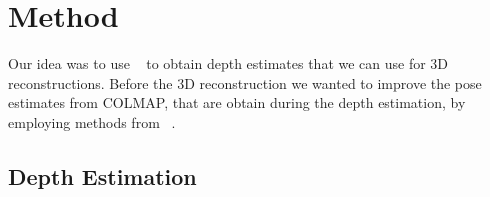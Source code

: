 \chapter{Method}
    Our idea was to use ~\cite{luo2020consistent} to obtain depth estimates that we can use for 3D reconstructions.
    Before the 3D reconstruction we wanted to improve the pose estimates from COLMAP, that are obtain during the depth estimation, by employing methods from ~\cite{dai2017bundlefusion}.
    \section{Depth Estimation}
